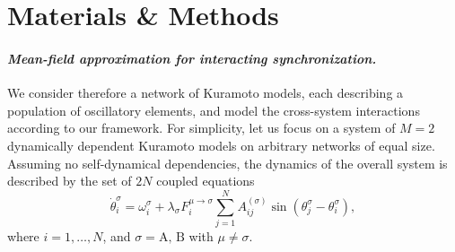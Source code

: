\documentclass[pre,twocolumn,superscriptaddress]{revtex4}
\newcommand{\1}{\mathds{1}}
\begin{document}
\section*{Materials \& Methods}{\small 
\paragraph*{\textbf{{\em{\small Mean-field approximation for interacting synchronization.}}}} 
We consider therefore a network of Kuramoto models, each describing a population of oscillatory elements, and model the cross-system interactions according to our framework. For simplicity, let us focus on a system of $M=2$ dynamically dependent Kuramoto models on arbitrary networks of equal size. Assuming no self-dynamical dependencies, the dynamics of the overall system is described by the set of $2N$ coupled equations 
\begin{equation}
\dot{\theta}_i^\sigma=\omega_i^\sigma+\lambda_\sigma F_i^{\mu\to\sigma}\sum_{j=1}^N A_{ij}^{(\sigma)}\sin(\theta_j^\sigma-\theta_i^\sigma),\label{eq:interKuraMM}
\end{equation}
where $i=1,\dots,N$, and $\sigma=\mathrm{A},\,\mathrm{B}$ with $\mu\neq\sigma$. 



}
\end{document}
